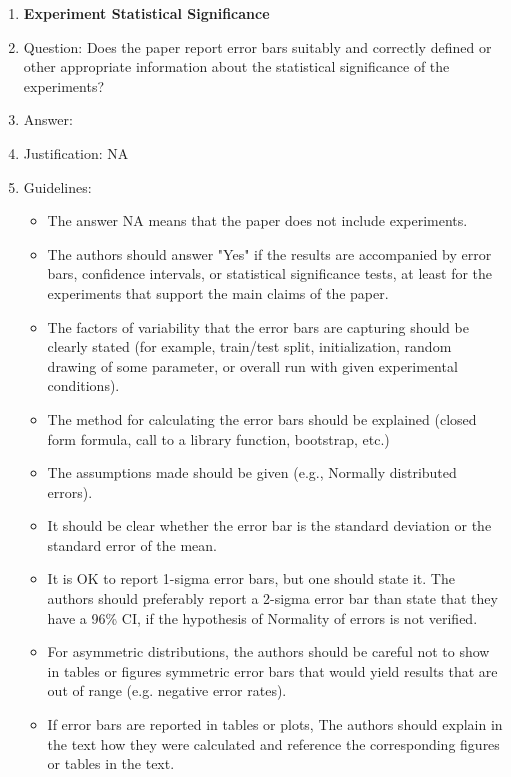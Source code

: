 \documentclass{article}
\begin{document}
\begin{enumerate}
\item {\bf Experiment Statistical Significance}
    \item[] Question: Does the paper report error bars suitably and correctly defined or other appropriate information about the statistical significance of the experiments?
    \item[] Answer: \answerNo{} %
    \item[] Justification: NA
    \item[] Guidelines:
    \begin{itemize}
        \item The answer NA means that the paper does not include experiments.
        \item The authors should answer "Yes" if the results are accompanied by error bars, confidence intervals, or statistical significance tests, at least for the experiments that support the main claims of the paper.
        \item The factors of variability that the error bars are capturing should be clearly stated (for example, train/test split, initialization, random drawing of some parameter, or overall run with given experimental conditions).
        \item The method for calculating the error bars should be explained (closed form formula, call to a library function, bootstrap, etc.)
        \item The assumptions made should be given (e.g., Normally distributed errors).
        \item It should be clear whether the error bar is the standard deviation or the standard error of the mean.
        \item It is OK to report 1-sigma error bars, but one should state it. The authors should preferably report a 2-sigma error bar than state that they have a 96\% CI, if the hypothesis of Normality of errors is not verified.
        \item For asymmetric distributions, the authors should be careful not to show in tables or figures symmetric error bars that would yield results that are out of range (e.g. negative error rates).
        \item If error bars are reported in tables or plots, The authors should explain in the text how they were calculated and reference the corresponding figures or tables in the text.
    \end{itemize}


\end{enumerate}
\end{document}
